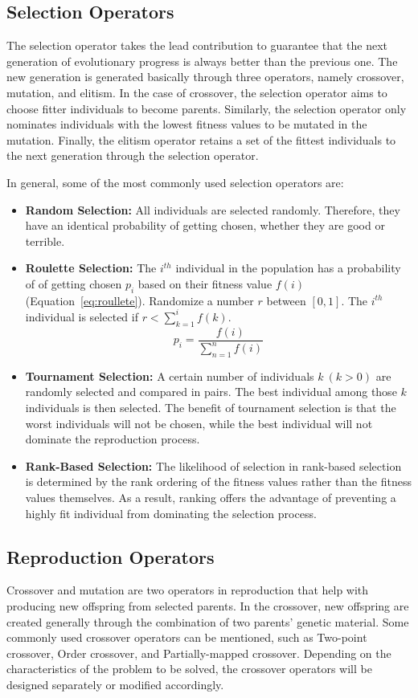 \subsection {Selection Operators}
\label{ga:selection}
The selection operator takes the lead contribution to guarantee that the next generation of evolutionary progress is always better than the previous one. The new generation is generated basically through three operators, namely crossover, mutation, and elitism. In the case of crossover, the selection operator aims to choose fitter individuals to become parents. Similarly, the selection operator only nominates individuals with the lowest fitness values to be mutated in the mutation. Finally, the elitism operator retains a set of the fittest individuals to the next generation through the selection operator. 

In general, some of the most commonly used selection operators are:
\begin{itemize}
	\item \textbf{Random Selection:} All individuals are selected randomly. Therefore, they have an identical probability of getting chosen, whether they are good or terrible.
	\item \textbf{Roulette Selection:} The $i^{th}$ individual in the population has a probability of of getting chosen $p_i$ based on their fitness value $f(i)$ (Equation~\ref{eq:roullete}). Randomize a number $r$ between $[0,1]$. The $i^{th}$ individual is selected if $r < \sum^i_{k=1} f(k)$.
	\begin{equation}
		\label{eq:roullete}
		p_i = \frac{f(i)}{\sum^n_{n=1} f(i)}
	\end{equation}
	\item \textbf{Tournament Selection:} A certain number of individuals $k~(k > 0)$ are randomly selected and compared in pairs. The best individual among those $k$ individuals is then selected. The benefit of tournament selection is that the worst individuals will not be chosen, while the best individual will not dominate the reproduction process. 
	\item \textbf{Rank-Based Selection:} The likelihood of selection in rank-based selection is determined by the rank ordering of the fitness values rather than the fitness values themselves. As a result, ranking offers the advantage of preventing a highly fit individual from dominating the selection process.
\end{itemize}


\subsection {Reproduction Operators}
\label{ga:reproduction}
Crossover and mutation are two operators in reproduction that help with producing new offspring from selected parents. In the crossover, new offspring are created generally through the combination of two parents' genetic material. Some commonly used crossover operators can be mentioned, such as Two-point crossover, Order crossover, and Partially-mapped crossover. Depending on the characteristics of the problem to be solved, the crossover operators will be designed separately or modified accordingly.

